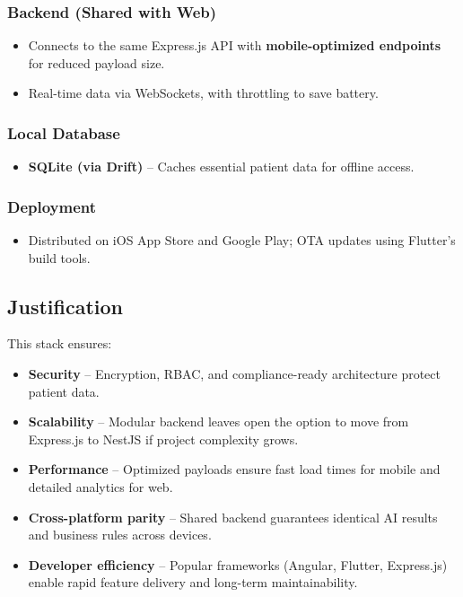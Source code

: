 \documentclass[a4paper, 12pt]{article}
\begin{document}
\subsubsection*{Backend (Shared with Web)}
\begin{itemize}
    \item Connects to the same Express.js API with \textbf{mobile-optimized endpoints} for reduced payload size.
    \item Real-time data via WebSockets, with throttling to save battery.
\end{itemize}

\subsubsection*{Local Database}
\begin{itemize}
    \item \textbf{SQLite (via Drift)} – Caches essential patient data for offline access.
\end{itemize}

\subsubsection*{Deployment}
\begin{itemize}
    \item Distributed on iOS App Store and Google Play; OTA updates using Flutter’s build tools.
\end{itemize}


\subsection{Justification}
This stack ensures:
\begin{itemize}
    \item \textbf{Security} – Encryption, RBAC, and compliance-ready architecture protect patient data.
    \item \textbf{Scalability} – Modular backend leaves open the option to move from Express.js to NestJS if project complexity grows.
    \item \textbf{Performance} – Optimized payloads ensure fast load times for mobile and detailed analytics for web.
    \item \textbf{Cross-platform parity} – Shared backend guarantees identical AI results and business rules across devices.
    \item \textbf{Developer efficiency} – Popular frameworks (Angular, Flutter, Express.js) enable rapid feature delivery and long-term maintainability.
\end{itemize}
\end{document}
